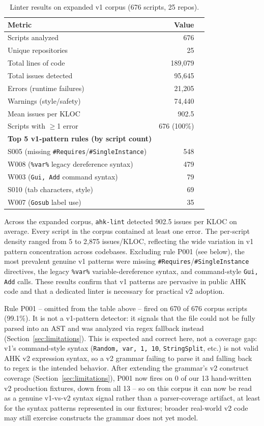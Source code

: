 \documentclass[11pt,a4paper]{article}
\begin{document}
\begin{table}[h]
\centering\small
\caption{Linter results on expanded v1 corpus (676 scripts, 25 repos).}
\label{tab:corpus_expanded}
\begin{tabular}{lrr}
\toprule
\textbf{Metric} & \textbf{Value} \\
\midrule
Scripts analyzed & 676 \\
Unique repositories & 25 \\
Total lines of code & 189,079 \\
Total issues detected & 95,645 \\
\quad Errors (runtime failures) & 21,205 \\
\quad Warnings (style/safety) & 74,440 \\
Mean issues per KLOC & 902.5 \\
Scripts with $\ge$1 error & 676 (100\%) \\
\midrule
\textbf{Top 5 v1-pattern rules (by script count)} \\
\quad S005 (missing \texttt{\#Requires}/\texttt{\#SingleInstance}) & 548 \\
\quad W008 (\texttt{\%var\%} legacy dereference syntax) & 479 \\
\quad W003 (\texttt{Gui, Add} command syntax) & 79 \\
\quad S010 (tab characters, style) & 69 \\
\quad W007 (\texttt{Gosub} label use) & 35 \\
\bottomrule
\end{tabular}
\end{table}

Across the expanded corpus, \texttt{ahk-lint} detected 902.5 issues per KLOC on average. Every script in the corpus contained at least one error. The per-script density ranged from 5 to 2,875 issues/KLOC, reflecting the wide variation in v1 pattern concentration across codebases. Excluding rule P001 (see below), the most prevalent genuine v1 patterns were missing \texttt{\#Requires}/\texttt{\#SingleInstance} directives, the legacy \texttt{\%var\%} variable-dereference syntax, and command-style \texttt{Gui, Add} calls. These results confirm that v1 patterns are pervasive in public AHK code and that a dedicated linter is necessary for practical v2 adoption.

Rule P001 -- omitted from the table above -- fired on 670 of 676 corpus scripts (99.1\%). It is not a v1-pattern detector: it signals that the file could not be fully parsed into an AST and was analyzed via regex fallback instead (Section~\ref{sec:limitations}). This is expected and correct here, not a coverage gap: v1's command-style syntax (\texttt{Random, var, 1, 10}, \texttt{StringSplit}, etc.) is not valid AHK v2 expression syntax, so a v2 grammar failing to parse it and falling back to regex is the intended behavior. After extending the grammar's v2 construct coverage (Section~\ref{sec:limitations}), P001 now fires on 0 of our 13 hand-written v2 production fixtures, down from all 13 -- so on this corpus it can now be read as a genuine v1-vs-v2 syntax signal rather than a parser-coverage artifact, at least for the syntax patterns represented in our fixtures; broader real-world v2 code may still exercise constructs the grammar does not yet model.
\end{document}
